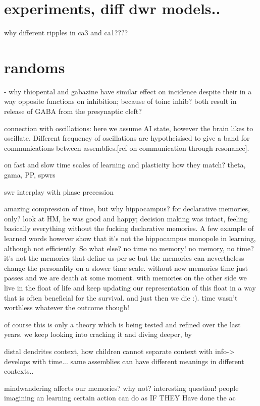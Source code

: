 \section{experiments, diff dwr models..}
  why different ripples in ca3 and ca1????
\section{randoms}

  - why thiopental and gabazine have similar effect on incidence despite
  their in a way opposite functions on inhibition; because of toinc inhib?
  both result in release of GABA from the presynaptic cleft?


  connection with oscillations:
  here we assume AI state, however the brain likes to oscillate. Different frequency of oscillations are hypotheisised to give a band for communications between assemblies.[ref on communication through resonance]. 

  on fast and slow time scales of learning and plasticity how they match? theta, gama, PP, spwrs

  swr interplay with phase precession

  amazing compression of time, but why hippocampus? for declarative memories, only? look at HM, he was good and happy; decision making was intact, feeling basically everything without the fucking declarative memories. A few example of learned words however show that it's not the hippocampus monopole in learning, although not efficiently. So what else? no time no memory! no memory, no time? 
  it's not the memories that define us per se but the memories can nevertheless change the personality on a slower time scale. without new memories time just passes and we are death at some moment. with memories on the other side we live in the float of life and keep updating our representation of this float in a way that is often beneficial for the survival. and just then we die :). time wasn't worthless whatever the outcome though!

  of course this is only a theory which is being tested and refined over the last years. we keep looking into cracking it and diving deeper, by 

  distal dendrites context, how children cannot separate context with info-> develops with time...
  same assemblies can have different meanings in different contexts..


  mindwandering affects our memories? why not? interesting question! people imagining an learning certain action can do as IF THEY Have done the ac

